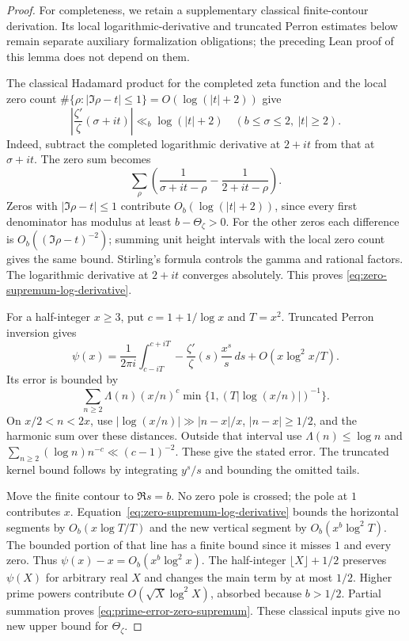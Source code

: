 \documentclass[11pt]{article}
\theoremstyle{definition}
\begin{document}
\begin{proof}
For completeness, we retain a supplementary classical finite-contour
derivation. Its local logarithmic-derivative and truncated Perron
estimates below remain separate auxiliary formalization obligations;
the preceding Lean proof of this lemma does not depend on them.

The classical Hadamard product for the completed zeta
function and the local zero count
$\#\{\rho:|\Im\rho-t|\le1\}=O(\log(|t|+2))$ give
\begin{equation}
 \left|\frac{\zeta'}{\zeta}(\sigma+it)\right|
       \ll_b\log(|t|+2)
       \quad(b\le\sigma\le2,\ |t|\ge2).
 \label{eq:zero-supremum-log-derivative}
\end{equation}
Indeed, subtract the completed logarithmic derivative at
$2+it$ from that at $\sigma+it$. The zero sum becomes
\[
 \sum_\rho\left(\frac1{\sigma+it-\rho}
                            -\frac1{2+it-\rho}\right).
\]
Zeros with $|\Im\rho-t|\le1$ contribute
$O_b(\log(|t|+2))$, since every first denominator has
modulus at least $b-\Theta_\zeta>0$.
For the other zeros each difference is
$O_b((\Im\rho-t)^{-2})$; summing unit height intervals
with the local zero count gives the same bound.
Stirling's formula controls the gamma and rational factors.
The logarithmic derivative at $2+it$ converges absolutely.
This proves \eqref{eq:zero-supremum-log-derivative}.

For a half-integer $x\ge3$, put $c=1+1/\log x$ and $T=x^2$.
Truncated Perron inversion gives
\[
 \psi(x)=\frac1{2\pi i}\int_{c-iT}^{c+iT}
       -\frac{\zeta'}{\zeta}(s)\frac{x^s}{s}\,ds
                           +O(x\log^2 x/T).
\]
Its error is bounded by
\[
 \sum_{n\ge2}\Lambda(n)(x/n)^c
                  \min\{1,(T|\log(x/n)|)^{-1}\}.
\]
On $x/2<n<2x$, use
$|\log(x/n)|\gg|n-x|/x$, $|n-x|\ge1/2$, and the
harmonic sum over these distances. Outside that interval
use $\Lambda(n)\le\log n$ and
$\sum_{n\ge2}(\log n)n^{-c}\ll(c-1)^{-2}$.
These give the stated error. The truncated kernel bound
follows by integrating $y^s/s$ and bounding the omitted tails.

Move the finite contour to $\Re s=b$.
No zero pole is crossed; the pole at $1$ contributes $x$.
Equation~\eqref{eq:zero-supremum-log-derivative} bounds the
horizontal segments by $O_b(x\log T/T)$ and the new vertical
segment by $O_b(x^b\log^2 T)$. The bounded portion of that
line has a finite bound since it misses $1$ and every zero.
Thus $\psi(x)-x=O_b(x^b\log^2 x)$.
The half-integer $\lfloor X\rfloor+1/2$ preserves $\psi(X)$
for arbitrary real $X$ and changes the main term by at most
$1/2$. Higher prime powers contribute
$O(\sqrt X\log^2 X)$, absorbed because $b>1/2$.
Partial summation proves \eqref{eq:prime-error-zero-supremum}.
These classical inputs give no new upper bound for
$\Theta_\zeta$.
\end{proof}
\end{document}
